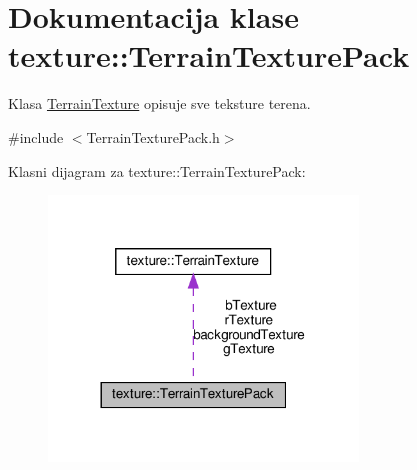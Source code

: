 \hypertarget{classtexture_1_1TerrainTexturePack}{}\section{Dokumentacija klase texture\+:\+:Terrain\+Texture\+Pack}
\label{classtexture_1_1TerrainTexturePack}


Klasa \hyperlink{classtexture_1_1TerrainTexture}{Terrain\+Texture} opisuje sve teksture terena.  




{\ttfamily \#include $<$Terrain\+Texture\+Pack.\+h$>$}



Klasni dijagram za texture\+:\+:Terrain\+Texture\+Pack\+:\nopagebreak
\begin{figure}[H]
\begin{center}
\leavevmode
\includegraphics[width=233pt]{classtexture_1_1TerrainTexturePack__coll__graph}
\end{center}
\end{figure}
